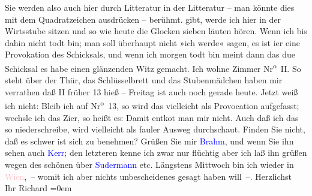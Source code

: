                Sie werden also auch hier durch Litteratur in der Litteratur – man könnte dies mit
               dem Quadratzeichen ausdrücken – berühmt. \label{K_L00913_2v}\label{K_L00913_2h} gibt,
               werde ich hier in der Wirtsstube sitzen und so wie heute die Glocken sieben {\pb}läuten hören. Wenn ich bis dahin
               nicht todt bin; man soll überhaupt nicht »ich werde« sagen, es ist i{\geminationm}er eine Provokation des Schicksals, und wenn ich morgen
               todt bin meint dann das du{\geminationm}e Schicksal es habe einen
               glänzenden Witz gemacht.\pend
           \pstart
           {\pb}Ich wohne Zimmer Nr\textsuperscript{o} II. So steht über der Thür, das Schlüsselbrett und das
               Stubenmädchen haben mir verrathen daß II früher 13 hieß – Freitag ist auch noch
               gerade heute. Jetzt weiß ich nicht: Bleib ich auf Nr\textsuperscript{o} 13,
               so wird das vielleicht als Provocation aufgefasst; {\pb}wechsle ich das Zi{\geminationm}er, so heißt es: Damit entko{\geminationm}t man mir nicht. Auch daß ich das so niederschreibe,
               wird vielleicht als fauler Ausweg durchschaut. Finden Sie nicht, daß es schwer ist
               sich zu benehmen? Grüßen Sie mir \textcolor{blue}{Brahm}{}\ledrightnote{\textcolor{blue}{Otto Brahm}}, und wenn
               Sie ihn {\pb}sehen auch \textcolor{blue}{Kerr}{}\ledrightnote{\textcolor{blue}{Alfred Kerr}}; den letzteren kenne ich zwar nur flüchtig
               aber ich laß ihn grüßen wegen des schönen \label{K_L00913_3v}\label{K_L00913_3h} über \textcolor{blue}{Sudermann}{}\ledrightnote{\textcolor{blue}{Hermann Sudermann}}
               etc.\pend
           \pstart
           Längstens Mittwoch bin ich wieder in \textcolor{pink}{Wien}{}\ledrightnote{\textcolor{pink}{Wien}}, – womit ich aber nichts unbescheidenes gesagt haben will –.\pend
           \pstart
           Herzlichst {\\[\baselineskip]}Ihr \spacefill\mbox{Richard}\pend
           \leftskip=0em{}\endnumbering{}  
      